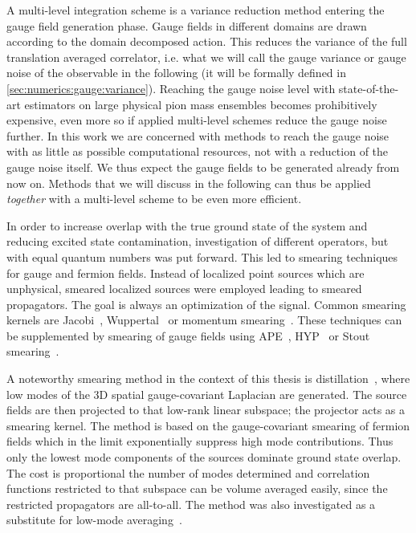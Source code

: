 A multi-level integration scheme is a variance reduction method entering the gauge field generation phase.
Gauge fields in different domains are drawn according to the domain decomposed action.
This reduces the variance of the full translation averaged correlator, i.e. what we will call the gauge variance or gauge noise of the observable in the following (it will be formally defined in \cref{sec:numerics:gauge:variance}).
Reaching the gauge noise level with state-of-the-art estimators on large physical pion mass ensembles becomes prohibitively expensive, even more so if applied multi-level schemes reduce the gauge noise further.
In this work we are concerned with methods to reach the gauge noise with as little as possible computational resources, not with a reduction of the gauge noise itself.
We thus expect the gauge fields to be generated already from now on.
Methods that we will discuss in the following can thus be applied \emph{together} with a multi-level scheme to be even more efficient. 

In order to increase overlap with the true ground state of the system and reducing excited state contamination, investigation of different operators, but with equal quantum numbers was put forward.
This led to smearing techniques for gauge and fermion fields.
Instead of localized point sources which are unphysical, smeared localized sources were employed leading to smeared propagators.
The goal is always an optimization of the signal.
Common smearing kernels are Jacobi~\cite{GUSKEN1989,PhysRevD.56.2743,Collins:1992fj,UKQCD:1993gym}, Wuppertal~\cite{GUSKEN1990361} or momentum smearing~\cite{Bali:2016lva}.
These techniques can be supplemented by smearing of gauge fields using APE~\cite{ALBANESE1987163}, HYP~\cite{Hasenfratz:2001hp} or Stout smearing~\cite{PhysRevD.69.054501}.


A noteworthy smearing method in the context of this thesis is distillation~\cite{HadronSpectrum:2009krc,Knechtli:2022bji}, where low modes of the 3D spatial gauge-covariant Laplacian are generated.
The source fields are then projected to that low-rank linear subspace; the projector acts as a smearing kernel.
The method is based on the gauge-covariant smearing of fermion fields which in the limit exponentially suppress high mode contributions.
Thus only the lowest mode components of the sources dominate ground state overlap.
The cost is proportional the number of modes determined and correlation functions restricted to that subspace can be volume averaged easily, since the restricted propagators are all-to-all.
The method was also investigated as a substitute for low-mode averaging~\cite{Bushnaq:2023}.

